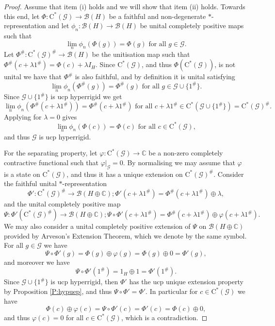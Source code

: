 \documentclass[11pt, draft]{amsart}
\numberwithin{equation}{section}
\theoremstyle{plain}
\theoremstyle{definition}
\theoremstyle{remark}
\newcommand{\B}{{\mathcal{B}}}
\newcommand{\G}{{\mathcal{G}}}
\def\la{\lambda}
\newcommand\vphi{\varphi}
\newcommand{\bC}{\mathbb{C}}
\newcommand{\foral}{\text{ for all }}
\newcommand{\ca}{\mathrm{C}^*}
\begin{document}
\begin{proof}
Assume that item (i) holds and we will show that item (ii) holds.
Towards this end, let $\Phi \colon \ca(\G) \to \B(H)$ be a faithful and non-degenerate $*$-representation and let $\phi_n \colon \B(H) \to \B(H)$ be unital completely positive maps such that
\[
\lim_n \phi_n(\Phi(g)) = \Phi(g) \foral g \in \G.
\]
Let $\Phi^{\#} \colon \ca(\G)^{\#} \to \B(H)$ be the unitisation map such that $\Phi^{\#}(c + \la 1^{\#}) = \Phi(c) + \la I_H$.
Since $\ca(\G)$, and thus $\Phi(\ca(\G))$, is not unital we have that $\Phi^{\#}$ is also faithful, and by definition it is unital satisfying
\[
\lim_n \phi_n(\Phi^{\#}(g)) = \Phi^{\#}(g) \foral g \in \G \cup \{1^{\#}\}.
\]
Since $\G \cup \{1^{\#}\}$ is ucp hyperrigid we get
\[
\lim_n \phi_n(\Phi^{\#}(c + \la 1^{\#})) = \Phi^{\#}(c + \la 1^{\#}) \foral c + \la 1^{\#} \in \ca(\G \cup \{1^{\#}\}) = \ca(\G)^{\#}.
\]
Applying for $\la=0$ gives
\[
\lim_n \phi_n(\Phi(c)) = \Phi(c) \foral c \in \ca(\G),
\]
and thus $\G$ is ucp hyperrigid.

For the separating property, let $\vphi \colon \ca(\G) \to \bC$ be a non-zero completely contractive functional such that $\vphi|_{\G} = 0$.
By normalising we may assume that $\vphi$ is a state on $\ca(\G)$, and thus it has a unique extension on $\ca(\G)^{\#}$.
Consider the faithful unital $*$-representation
\[
\Phi' \colon \ca(\G)^{\#} \to \B(H \oplus \bC); \Phi'(c + \la 1^{\#}) = \Phi^\#(c+\la 1^{\#}) \oplus \la,
\]
and the unital completely positive map
\[
\Psi \colon \Phi'(\ca(\G)^{\#}) \to \B(H \oplus \bC); \Psi \circ \Phi'(c + \la 1^{\#}) = \Phi^\#(c+ \la 1^{\#}) \oplus \vphi(c + \la 1^{\#}).
\]
We may also consider a unital completely positive extension of $\Psi$ on $\B(H \oplus \bC)$ provided by Arveson's Extension Theorem, which we denote by the same symbol.
For all $g \in \G$ we have
\[
\Psi \circ \Phi'(g) = \Phi(g) \oplus \vphi(g) = \Phi(g) \oplus 0 = \Phi'(g),
\]
and moreover we have
\[
\Psi \circ \Phi'(1^{\#}) = 1_H \oplus 1 = \Phi'(1^{\#}).
\]
Since $\G \cup \{1^{\#}\}$ is ucp hyperrigid, then $\Phi'$ has the ucp unique extension property by Proposition \ref{P:hypuep}, and thus $\Psi \circ \Phi' = \Phi'$.
In particular for $c \in \ca(\G)$ we have
\[
\Phi(c) \oplus \vphi(c) = \Psi \circ \Phi'(c) = \Phi'(c) = \Phi(c) \oplus 0,
\]
and thus $\vphi(c) = 0$ for all $c \in \ca(\G)$, which is a contradiction.


\end{proof}
\end{document}
